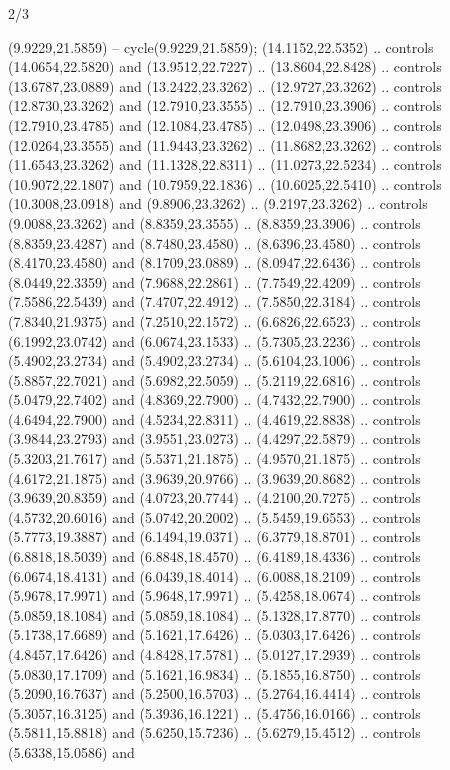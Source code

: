 \begin{flagdescription}{2/3}
\begin{scope}[yshift=\flagwidth,scale=\flagwidth/1241.93737]
\begin{scope}[y=-1mm, x=1mm,draw=gold,fill=blue,line join=miter,miter limit=4,line width=1.8\lw]
{  (9.9229,21.5859) -- cycle(9.9229,21.5859);
 (14.1152,22.5352) .. controls (14.0654,22.5820)
  and (13.9512,22.7227) .. (13.8604,22.8428) .. controls (13.6787,23.0889) and
  (13.2422,23.3262) .. (12.9727,23.3262) .. controls (12.8730,23.3262) and
  (12.7910,23.3555) .. (12.7910,23.3906) .. controls (12.7910,23.4785) and
  (12.1084,23.4785) .. (12.0498,23.3906) .. controls (12.0264,23.3555) and
  (11.9443,23.3262) .. (11.8682,23.3262) .. controls (11.6543,23.3262) and
  (11.1328,22.8311) .. (11.0273,22.5234) .. controls (10.9072,22.1807) and
  (10.7959,22.1836) .. (10.6025,22.5410) .. controls (10.3008,23.0918) and
  (9.8906,23.3262) .. (9.2197,23.3262) .. controls (9.0088,23.3262) and
  (8.8359,23.3555) .. (8.8359,23.3906) .. controls (8.8359,23.4287) and
  (8.7480,23.4580) .. (8.6396,23.4580) .. controls (8.4170,23.4580) and
  (8.1709,23.0889) .. (8.0947,22.6436) .. controls (8.0449,22.3359) and
  (7.9688,22.2861) .. (7.7549,22.4209) .. controls (7.5586,22.5439) and
  (7.4707,22.4912) .. (7.5850,22.3184) .. controls (7.8340,21.9375) and
  (7.2510,22.1572) .. (6.6826,22.6523) .. controls (6.1992,23.0742) and
  (6.0674,23.1533) .. (5.7305,23.2236) .. controls (5.4902,23.2734) and
  (5.4902,23.2734) .. (5.6104,23.1006) .. controls (5.8857,22.7021) and
  (5.6982,22.5059) .. (5.2119,22.6816) .. controls (5.0479,22.7402) and
  (4.8369,22.7900) .. (4.7432,22.7900) .. controls (4.6494,22.7900) and
  (4.5234,22.8311) .. (4.4619,22.8838) .. controls (3.9844,23.2793) and
  (3.9551,23.0273) .. (4.4297,22.5879) .. controls (5.3203,21.7617) and
  (5.5371,21.1875) .. (4.9570,21.1875) .. controls (4.6172,21.1875) and
  (3.9639,20.9766) .. (3.9639,20.8682) .. controls (3.9639,20.8359) and
  (4.0723,20.7744) .. (4.2100,20.7275) .. controls (4.5732,20.6016) and
  (5.0742,20.2002) .. (5.5459,19.6553) .. controls (5.7773,19.3887) and
  (6.1494,19.0371) .. (6.3779,18.8701) .. controls (6.8818,18.5039) and
  (6.8848,18.4570) .. (6.4189,18.4336) .. controls (6.0674,18.4131) and
  (6.0439,18.4014) .. (6.0088,18.2109) .. controls (5.9678,17.9971) and
  (5.9648,17.9971) .. (5.4258,18.0674) .. controls (5.0859,18.1084) and
  (5.0859,18.1084) .. (5.1328,17.8770) .. controls (5.1738,17.6689) and
  (5.1621,17.6426) .. (5.0303,17.6426) .. controls (4.8457,17.6426) and
  (4.8428,17.5781) .. (5.0127,17.2939) .. controls (5.0830,17.1709) and
  (5.1621,16.9834) .. (5.1855,16.8750) .. controls (5.2090,16.7637) and
  (5.2500,16.5703) .. (5.2764,16.4414) .. controls (5.3057,16.3125) and
  (5.3936,16.1221) .. (5.4756,16.0166) .. controls (5.5811,15.8818) and
  (5.6250,15.7236) .. (5.6279,15.4512) .. controls (5.6338,15.0586) and
}
\end{scope}
\end{scope}
\end{flagdescription}
